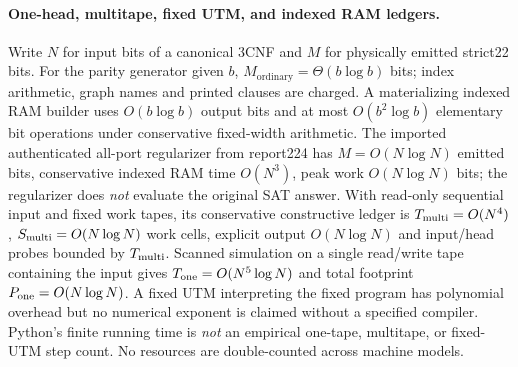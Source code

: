 \documentclass[11pt]{article}
\begin{document}
\paragraph{One-head, multitape, fixed UTM, and indexed RAM ledgers.} Write $N$ for input bits of a canonical 3CNF and $M$ for physically emitted strict22 bits. For the parity generator given $b$, $M_{\mathrm{ordinary}}=\Theta(b\log b)$ bits; index arithmetic, graph names and printed clauses are charged. A materializing indexed RAM builder uses $O(b\log b)$ output bits and at most $O(b^2\log b)$ elementary bit operations under conservative fixed-width arithmetic. The imported authenticated all-port regularizer from report224 has $M=O(N\log N)$ emitted bits, conservative indexed RAM time $O(N^3)$, peak work $O(N\log N)$ bits; the regularizer does \emph{not} evaluate the original SAT answer. With read-only sequential input and fixed work tapes, its conservative constructive ledger is $T_{\rm multi}=O(N^4)$, $S_{\rm multi}=O(N\log N)$ work cells, explicit output $O(N\log N)$ and input/head probes bounded by $T_{\rm multi}$. Scanned simulation on a single read/write tape containing the input gives $T_{\rm one}=O(N^5\log N)$ and total footprint $P_{\rm one}=O(N\log N)$. A fixed UTM interpreting the fixed program has polynomial overhead but no numerical exponent is claimed without a specified compiler. Python's finite running time is \emph{not} an empirical one-tape, multitape, or fixed-UTM step count. No resources are double-counted across machine models.
\end{document}
